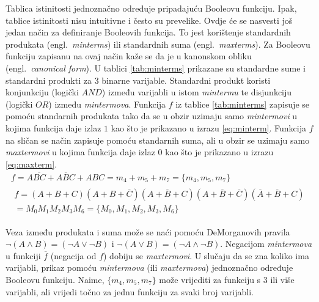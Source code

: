 \documentclass[times, utf8, diplomski]{fer}
\begin{document}
Tablica istinitosti jednoznačno određuje pripadajuću Booleovu funkciju. Ipak, tablice istinitosti nisu intuitivne i često su prevelike. Ovdje će se nasvesti još jedan način za definiranje Booleovih funkcija. To jest korištenje standardnih produkata (engl.~\textit{minterms}) ili standardnih suma (engl.~\textit{maxterms}). Za Booleovu funkciju zapisanu na ovaj način kaže se da je u kanonskom obliku (engl.~\textit{canonical form}). U tablici \ref{tab:minterms} prikazane su standardne sume i standardni produkti za $3$ binarne varijable. Standardni produkt koristi konjunkciju (logički $AND$) između varijabli u istom \textit{mintermu} te disjunkciju (logički $OR$) između \textit{mintermova}. Funkcija $f$ iz tablice \ref{tab:minterms} zapisuje se pomoću standarnih produkata tako da se u obzir uzimaju samo \textit{mintermovi} u kojima funkcija daje izlaz $1$ kao što je prikazano u izrazu \ref{eq:minterm}. Funkcija $f$ na sličan se način zapisuje pomoću standarnih suma, ali u obzir se uzimaju samo \textit{maxtermovi} u kojima funkcija daje izlaz $0$ kao što je prikazano u izrazu \ref{eq:maxterm}.
%
\begin{gather}
	\label{eq:minterm}
	f=A\overline{BC}+A\overline{B}C+ABC=m_{4}+m_{5}+m_{7}=\{m_{4}, m_{5}, m_{7}\} \\
	\label{eq:maxterm}
	\begin{split}
		f=(A+B+C)(A+B+\overline{C})(A+\overline{B}+C)(A+\overline{B}+\overline{C})(\overline{A}+\overline{B}+C) \\
		=M_{0}M_{1}M_{2}M_{3}M_{6}=\{M_{0}, M_{1}, M_{2}, M_{3}, M_{6}\}
	\end{split}
\end{gather}

\noindent
Veza između produkata i suma može se naći pomoću DeMorganovih pravila $\neg (A \land B)=(\neg A \lor \neg B)$ i $\neg (A \lor B)=(\neg A \land \neg B)$. Negacijom \textit{mintermova} u funkciji $\overline{f}$ (negacija od $f$) dobiju se \textit{maxtermovi}. U slučaju da se zna koliko ima varijabli, prikaz pomoću \textit{mintermova} (ili \textit{maxtermova}) jednoznačno određuje Booleovu funkciju. Naime, $\{m_{4}, m_{5}, m_{7}\}$ može vrijediti za funkciju s $3$ ili više varijabli, ali vrijedi točno za jednu funkciju za svaki broj varijabli.
\end{document}

